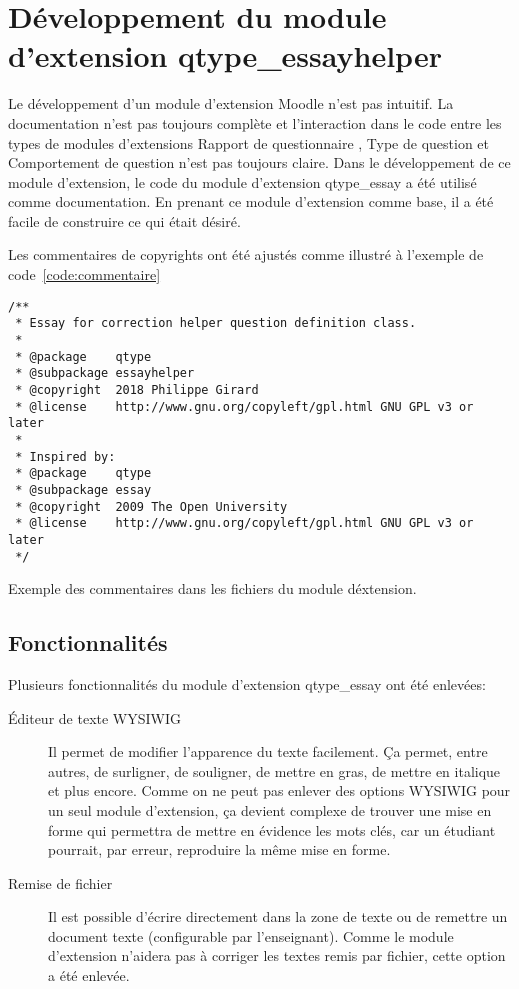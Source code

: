 \chapter{Développement du module d'extension \og qtype\_essayhelper \fg{} }

Le développement d'un module d'extension Moodle n'est pas intuitif.
La documentation n'est pas toujours complète et l'interaction dans le code entre les types de modules d'extensions \og Rapport de questionnaire \fg{}, \og Type de question \fg{} et \og Comportement de question \fg{} n'est pas toujours claire.
Dans le développement de ce module d'extension, le code du module d'extension \og qtype\_essay \fg{} a été utilisé comme documentation.
En prenant ce module d'extension comme base, il a été facile de construire ce qui était désiré.

Les commentaires de copyrights ont été ajustés comme illustré à l'exemple de code~\ref{code:commentaire}

\begin{lstfloat}
\begin{lstlisting}[frame=l]
/**
 * Essay for correction helper question definition class.
 *
 * @package    qtype
 * @subpackage essayhelper
 * @copyright  2018 Philippe Girard
 * @license    http://www.gnu.org/copyleft/gpl.html GNU GPL v3 or later
 *
 * Inspired by:
 * @package    qtype
 * @subpackage essay
 * @copyright  2009 The Open University
 * @license    http://www.gnu.org/copyleft/gpl.html GNU GPL v3 or later
 */
\end{lstlisting}
\caption{Exemple des commentaires dans les fichiers du module d\'extension.}
\label{code:commentaire}
\end{lstfloat}

\section{Fonctionnalités}

Plusieurs fonctionnalités du module d'extension \og qtype\_essay \fg{} ont été enlevées:

\begin{description}
  \item[Éditeur de texte WYSIWIG]
  
  Il permet de modifier l'apparence du texte facilement.
  Ça permet, entre autres, de surligner, de souligner, de mettre en gras, de mettre en italique et plus encore.
  Comme on ne peut pas enlever des options WYSIWIG pour un seul module d'extension, ça devient complexe de trouver une mise en forme qui permettra de mettre en évidence les mots clés, car un étudiant pourrait, par erreur, reproduire la même mise en forme.
  
  \item[Remise de fichier]
  
  Il est possible d'écrire directement dans la zone de texte ou de remettre un document texte (configurable par l'enseignant).
  Comme le module d'extension n'aidera pas à corriger les textes remis par fichier, cette option a été enlevée.
\end{description}

